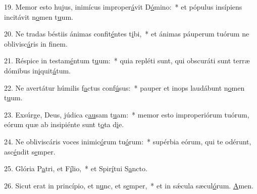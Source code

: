 19. Memor esto hujus, inimícus improper\uline{á}vit D\uline{ó}mino:~* et pópulus insípiens incitávit n\uline{o}men t\uline{u}um.\par 
20. Ne tradas béstiis ánimas confit\uline{é}ntes t\uline{i}bi,~* et ánimas páuperum tuórum ne oblivisc\uline{á}ris in f\uline{i}nem.\par 
21. Réspice in testam\uline{é}ntum t\uline{u}um:~* quia repléti sunt, qui obscuráti sunt terræ dómibus in\uline{i}quit\uline{á}tum.\par 
22. Ne avertátur húmilis f\uline{a}ctus conf\uline{ú}sus:~* pauper et inops laudábunt n\uline{o}men t\uline{u}um.\par 
23. Exsúrge, Deus, júdica c\uline{au}sam t\uline{u}am:~* memor esto improperiórum tuórum, eórum quæ ab insipiénte sunt t\uline{o}ta d\uline{i}e.\par 
24. Ne obliviscáris voces inimic\uline{ó}rum tu\uline{ó}rum:~* supérbia eórum, qui te odérunt, asc\uline{é}ndit s\uline{e}mper.\par 
25. Glória P\uline{a}tri, et F\uline{í}lio,~* et Spir\uline{í}tui S\uline{a}ncto.\par 
26. Sicut erat in princípio, et n\uline{u}nc, et s\uline{e}mper,~* et in sǽcula sæcul\uline{ó}rum. \uline{A}men.\par 
